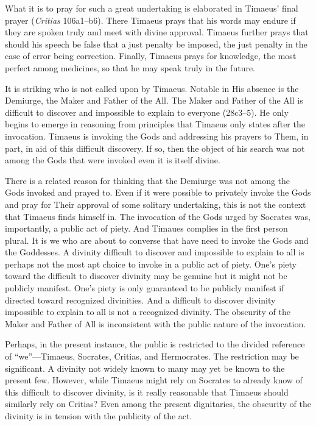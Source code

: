 What it is to pray for such a great undertaking is elaborated in Timaeus' final prayer (\emph{Critias} 106a1–b6). There Timaeus prays that his words may endure if they are spoken truly and meet with divine approval. Timaeus further prays that should his speech be false that a just penalty be imposed, the just penalty in the case of error being correction. Finally, Timaeus prays for knowledge, the most perfect among medicines, so that he may speak truly in the future.

It is striking who is not called upon by Timaeus. Notable in His absence is the Demiurge, the Maker and Father of the All. The Maker and Father of the All is difficult to discover and impossible to explain to everyone (28c3–5). He only begins to emerge in reasoning from principles that Timaeus only states after the invocation. Timaeus is invoking the Gods and addressing his prayers to Them, in part, in aid of this difficult discovery. If so, then the object of his search was not among the Gods that were invoked even it is itself divine.

There is a related reason for thinking that the Demiurge was not among the Gods invoked and prayed to. Even if it were possible to privately invoke the Gods and pray for Their approval of some solitary undertaking, this is not the context that Timaeus finds himself in. The invocation of the Gods urged by Socrates was, importantly, a public act of piety. And Timaues complies in the first person plural. It is we who are about to converse that have need to invoke the Gods and the Goddesses. A divinity difficult to discover and impossible to explain to all is perhaps not the most apt choice to invoke in a public act of piety. One's piety toward the difficult to discover divinity may be genuine but it might not be publicly manifest. One's piety is only guaranteed to be publicly manifest if directed toward recognized divinities. And a difficult to discover divinity impossible to explain to all is not a recognized divinity. The obscurity of the Maker and Father of All is inconsistent with the public nature of the invocation.

Perhaps, in the present instance, the public is restricted to the divided reference of ``we''---Timaeus, Socrates, Critias, and Hermocrates. The restriction may be significant. A divinity not widely known to many may yet be known to the present few. However, while Timaeus might rely on Socrates to already know of this difficult to discover divinity, is it really reasonable that Timaeus should similarly rely on Critias? Even among the present dignitaries, the obscurity of the divinity is in tension with the publicity of the act.

